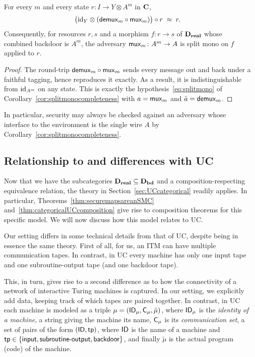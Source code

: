 \begin{lemma}\label{lem:muxcompleteness}
For every $m$ and every state $r \colon I\to Y \otimes A^m$ in $\CC$,
\[
\bigl(\id[Y] \otimes(\demux_m\circ\mux_m)\bigr)\circ r \;\approx\; r .
\]
Consequently, for resources $r,s$ and a morphism $f \colon r\to s$ of $\DR$ whose combined
backdoor is $A^m$, the adversary $\mux_m \colon A^m\to A$ is split mono on $f$ applied to $r$. 
\end{lemma}

\begin{proof}
The round-trip $\demux_m\circ\mux_m$ sends every message out and back under a faithful tagging, hence reproduces it exactly. As a result, it is indistinguishable from $\id[A^m]$ on any state. This is exactly the
hypothesis~\eqref{eq:splitmono} of Corollary~\ref{cor:splitmonocompleteness} with $a=\mux_m$ and $\bar a=\demux_m$.
\end{proof}

In particular, security may always be checked against an adversary whose interface to the environment is the single wire $A$ by Corollary~\ref{cor:splitmonocompleteness}.



\subsection{Relationship to and differences with UC}\label{ssec:translatingtoUC}


Now that we have the subcategories $\DR\subseteq  \DB$ and a composition-respecting equivalence relation, the theory in Section~\ref{sec:UCcategorical} readily applies. In particular, Theorems~\ref{thm:securemapsareanSMC} and~\ref{thm:categoricalUCcomposition} give rise to composition theorems for this specific model. We will now discuss how this model relates to UC. 

Our setting differs in some technical details from that of UC, despite being in essence the same theory. First of all, for us, an ITM can have  multiple communication tapes. In contrast, in UC every machine has only one input tape and one subroutine-output tape (and one backdoor tape).

This, in turn, gives rise to a second difference as to how the connectivity of a network of interactive Turing machines is captured. In our setting, we explicitly add data, keeping track of which tapes are paired together. In contrast, in UC each machine is modeled as a triple $\mu=(\ucid_\mu,\uccom_\mu,\tilde{\mu})$, where $\ucid_\mu$ is the \emph{identity of a machine}, \ie a string giving the machine its name, $\uccom_\mu$ is its \emph{communication set}, \ie a set of pairs of the form $(\ucid, \tp)$, where $\ucid$ is the name of a machine and $\tp \in \{\uci,\ucsro,\ucbd \}$, and finally $\tilde{\mu}$ is the actual program (code) of the machine. 

